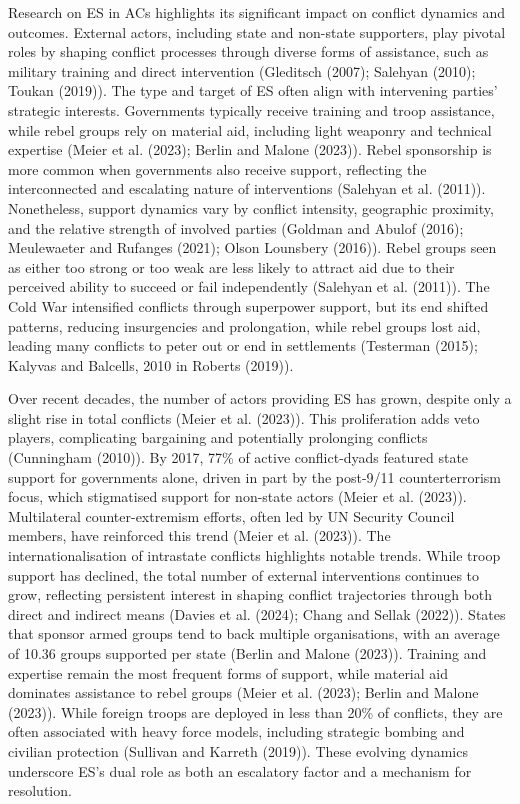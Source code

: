 \documentclass[
]{article}
\begin{document}
Research on ES in ACs highlights its significant impact on conflict
dynamics and outcomes. External actors, including state and non-state
supporters, play pivotal roles by shaping conflict processes through
diverse forms of assistance, such as military training and direct
intervention (Gleditsch (2007); Salehyan (2010); Toukan (2019)). The
type and target of ES often align with intervening parties' strategic
interests. Governments typically receive training and troop assistance,
while rebel groups rely on material aid, including light weaponry and
technical expertise (Meier et al. (2023); Berlin and Malone (2023)).
Rebel sponsorship is more common when governments also receive support,
reflecting the interconnected and escalating nature of interventions
(Salehyan et al. (2011)). Nonetheless, support dynamics vary by conflict
intensity, geographic proximity, and the relative strength of involved
parties (Goldman and Abulof (2016); Meulewaeter and Rufanges (2021);
Olson Lounsbery (2016)). Rebel groups seen as either too strong or too
weak are less likely to attract aid due to their perceived ability to
succeed or fail independently (Salehyan et al. (2011)). The Cold War
intensified conflicts through superpower support, but its end shifted
patterns, reducing insurgencies and prolongation, while rebel groups
lost aid, leading many conflicts to peter out or end in settlements
(Testerman (2015); Kalyvas and Balcells, 2010 in Roberts (2019)).

Over recent decades, the number of actors providing ES has grown,
despite only a slight rise in total conflicts (Meier et al. (2023)).
This proliferation adds veto players, complicating bargaining and
potentially prolonging conflicts (Cunningham (2010)). By 2017, 77\% of
active conflict-dyads featured state support for governments alone,
driven in part by the post-9/11 counterterrorism focus, which
stigmatised support for non-state actors (Meier et al. (2023)).
Multilateral counter-extremism efforts, often led by UN Security Council
members, have reinforced this trend (Meier et al. (2023)). The
internationalisation of intrastate conflicts highlights notable trends.
While troop support has declined, the total number of external
interventions continues to grow, reflecting persistent interest in
shaping conflict trajectories through both direct and indirect means
(Davies et al. (2024); Chang and Sellak (2022)). States that sponsor
armed groups tend to back multiple organisations, with an average of
10.36 groups supported per state (Berlin and Malone (2023)). Training
and expertise remain the most frequent forms of support, while material
aid dominates assistance to rebel groups (Meier et al. (2023); Berlin
and Malone (2023)). While foreign troops are deployed in less than 20\%
of conflicts, they are often associated with heavy force models,
including strategic bombing and civilian protection (Sullivan and
Karreth (2019)). These evolving dynamics underscore ES's dual role as
both an escalatory factor and a mechanism for resolution.
\end{document}

